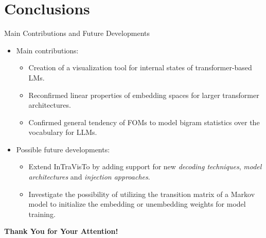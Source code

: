 \documentclass[aspectratio=169, 12pt, compress]{beamer}
\begin{document}
    \section{Conclusions}

    \begin{frame}{Main Contributions and Future Developments}
        \begin{itemize}[<+|visible@+->]
            \item<1-1> Main contributions:
            \begin{itemize}
                \item<1-1> Creation of a visualization tool for internal states of transformer-based LMs.
                \item<1-1> Reconfirmed linear properties of embedding spaces for larger transformer architectures.
                \item<1-1> Confirmed general tendency of FOMs to model bigram statistics over the vocabulary for LLMs.
            \end{itemize}
            \item<2-2> Possible future developments:
            \begin{itemize}
                \item<2-2> Extend InTraVisTo by adding support for new \emph{decoding techniques}, \emph{model architectures} and \emph{injection approaches}.
                \item<2-2> Investigate the possibility of utilizing the transition matrix of a Markov model to initialize the embedding or unembedding weights for model training.
            \end{itemize}
        \end{itemize}
    \end{frame}

    \begin{frame}[plain]{}
        \vspace{1.5cm}
        \begin{minipage}[t][\baselineskip]{\textwidth}
        {
            \center
            \Large\bf Thank You for Your Attention! \par
        }
        \end{minipage}
    \end{frame}

    \section{}
\end{document}
